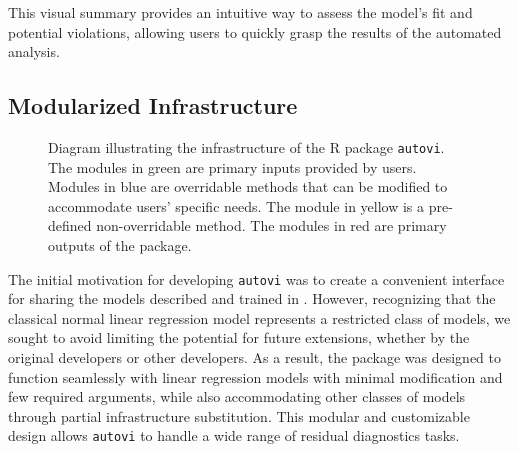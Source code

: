 \documentclass[
doublespace,
  times]{anzsauth}
\begin{document}
This visual summary provides an intuitive way to assess the model's fit
and potential violations, allowing users to quickly grasp the results of
the automated analysis.

\subsection{Modularized Infrastructure}\label{sec-autovi-infrastructure}

\begin{figure}


\caption{\label{fig-autovi-diag}Diagram illustrating the infrastructure
of the R package \texttt{autovi}. The modules in green are primary
inputs provided by users. Modules in blue are overridable methods that
can be modified to accommodate users' specific needs. The module in
yellow is a pre-defined non-overridable method. The modules in red are
primary outputs of the package.}

\end{figure}%

The initial motivation for developing \texttt{autovi} was to create a
convenient interface for sharing the models described and trained in
\citet{li2024automated}. However, recognizing that the classical normal
linear regression model represents a restricted class of models, we
sought to avoid limiting the potential for future extensions, whether by
the original developers or other developers. As a result, the package
was designed to function seamlessly with linear regression models with
minimal modification and few required arguments, while also
accommodating other classes of models through partial infrastructure
substitution. This modular and customizable design allows
\texttt{autovi} to handle a wide range of residual diagnostics tasks.
\end{document}
